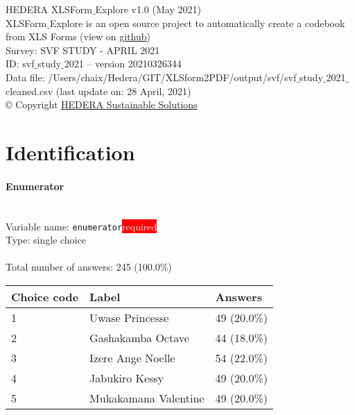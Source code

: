 \documentclass[11.5pt, a4paper]{scrartcl}
\begin{document}
\setmainfont{Josefin Sans}
\setcounter{secnumdepth}{1}
\parindent 0pt
\tableofcontents

\vspace*{\fill}
\begin{minipage}[t]{0.7\textwidth}
{\small
\begin{flushleft}
HEDERA XLSForm$\_$Explore v1.0 (May 2021) \\[0.2em]
XLSForm$\_$Explore is an open source project to
automatically create a codebook from XLS Forms (view on \href{https://github.com/HEDERA-PLATFORM/XLSform2PDF}{github})\\
Survey: SVF STUDY - APRIL 2021\\
ID: svf$\_$study$\_$2021 -- version 20210326344\\
Data file: /Users/chaix/Hedera/GIT/XLSform2PDF/output/svf/svf$\_$study$\_$2021$\_$cleaned.csv (last update on: 28 April, 2021) \\
© Copyright \href{https://hedera.online}{HEDERA Sustainable Solutions}
\end{flushleft}
}\end{minipage}
\newpage\section{Identification}
\paragraph{Enumerator}
\  \\Variable name: \texttt{enumerator}\hfill\colorbox{red}{\small{\textcolor{white}{required}}}\\
 Type: single choice\\
\\Total number of answers: 245 (100.0\%)
\\[0.2em] \begin{tabular}{p{4cm}|p{8cm}|p{3cm}}
Choice code & Label & Answers \\
\hline
1 & Uwase Princesse& \cellcolor{color0}49 (20.0\%)\\
\cellcolor{mygray} 2 & \cellcolor{mygray}Gashakamba Octave & \cellcolor{color0}44 (18.0\%)\\
3 & Izere Ange Noelle& \cellcolor{color1}54 (22.0\%)\\
\cellcolor{mygray} 4 & \cellcolor{mygray}Jabukiro Kessy & \cellcolor{color0}49 (20.0\%)\\
5 & Mukakamana Valentine& \cellcolor{color0}49 (20.0\%)\\
\end{tabular}
\end{document}
